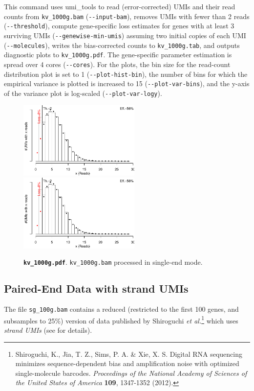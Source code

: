 \documentclass[10pt]{article}
\makeatletter
\newcommand{\ddarg}[1]{\texttt{-{}-#1}}
\DeclareRobustCommand*{\nameref}[1]{%
      \textit{\my@nameref{#1}}%
    }%
\makeatother
\begin{document}

This command uses umi\_tools to read (error-corrected) UMIs and their read counts from \texttt{kv\_1000g.bam} (\ddarg{input-bam}), removes UMIs with fewer than 2 reads (\ddarg{threshold}), compute gene-specific loss estimates for genes with at least 3 surviving UMIs (\ddarg{genewise-min-umis}) assuming two initial copies of each UMI (\ddarg{molecules}), writes the bias-corrected counts to \texttt{kv\_1000g.tab}, and outputs diagnostic plots to \texttt{kv\_1000g.pdf}. The gene-specific parameter estimation is spread over 4 cores (\ddarg{cores}). For the plots, the bin size for the read-count distribution plot is set to 1 (\ddarg{plot-hist-bin}), the number of bins for which the empirical variance is plotted is increased to 15 (\ddarg{plot-var-bins}), and the y-axis of the variance plot is log-scaled (\ddarg{plot-var-logy}).

\begin{figure}[H]
{\centering
\includegraphics[width=6cm,page=1]{../examples/kv_1000g.pdf}
\includegraphics[width=6cm,page=2]{../examples/kv_1000g.pdf}
\\}
\caption*{\textbf{\texttt{kv\_1000g.pdf}}. \texttt{kv\_1000g.bam} processed in single-end mode.}
\end{figure}

\subsection{Paired-End Data with strand UMIs}

The file \texttt{sg\_100g.bam} contains a reduced (restricted to the first 100 genes, and subsamples to 25\%) version of data published by Shiroguchi \textit{et al.}\footnote{Shiroguchi, K., Jia, T. Z., Sims, P. A. \& Xie, X. S. Digital RNA sequencing minimizes sequence-dependent bias and amplification noise with optimized single-molecule barcodes. \textit{Proceedings of the National Academy of Sciences of the United States of America} \textbf{109}, 1347-1352 (2012).} which uses \emph{strand UMIs} (see \nameref{strand-umis} for details).
\end{document}

